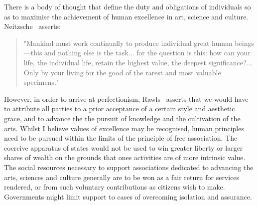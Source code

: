 \documentclass[11pt, oneside]{article}   	%
\begin{document}
There is a body of thought that define the duty and obligations of individuals so as to maximise the achievement of human excellence in art, science and culture. Neitzsche~\cite{gam1} asserts:
\begin{quote}
"Mankind must work continually to produce individual great human beings---this and nothing else is the task... for the question is this: how can your life, the individual life, retain the highest value, the deepest significance?... Only by your living for the good of the rarest and most valuable specimens."
\end{quote}
However, in order to arrive at perfectionism, Rawls~\cite{jr1} asserts that we would have to attribute all parties to a prior acceptance of a certain style and aesthetic grace, and to advance the the pursuit of knowledge and the cultivation of the arts.
Whilst I believe values of excellence may be recognised, human principles need to be pursued within the limits of the principle of free association.
The coercive apparatus of states would not be used to win greater liberty or larger shares of wealth on the grounds that ones activities are of more intrinsic value.
The social resources necessary to support associations dedicated to advancing the arts, sciences and culture generally are to be won as a fair return for services rendered, or from such voluntary contributions as citizens wish to make.
Governments might limit support to cases of overcoming isolation and assurance.
\end{document}
